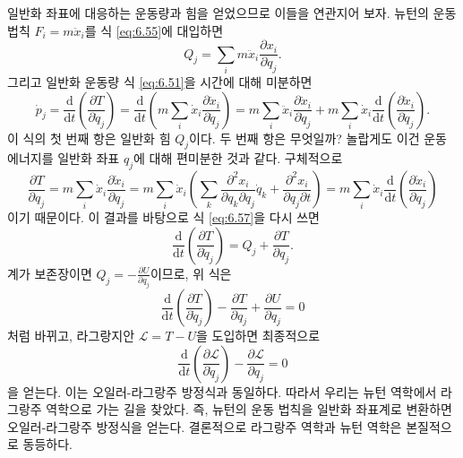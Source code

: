 \documentclass[chapter, oneside, b5paper]{oblivoir}
\theoremstyle{plain}
\theoremstyle{definition}
\theoremstyle{remark}
\begin{document}
일반화 좌표에 대응하는 운동량과 힘을 얻었으므로 이들을 연관지어 보자. 뉴턴의 운동 법칙 $F_i = m\ddot{x}_i$를 식 \ref{eq:6.55}에 대입하면
\begin{equation}
    Q_j = \sum_i m\ddot{x}_i \frac{\partial x_i}{\partial q_j}.
\end{equation}
그리고 일반화 운동량 식 \ref{eq:6.51}을 시간에 대해 미분하면
\begin{equation}
    \dot{p}_j = \frac{\mathrm{d}}{\mathrm{d}t}\left(\frac {\partial T}{\partial \dot{q}_j} \right)= \frac{\mathrm{d}}{\mathrm{d}t}\left(m\sum_i \dot{x}_i\frac{\partial \dot{x}_i}{\partial \dot{q}_j}\right) = m\sum_i \ddot{x}_i\frac{\partial \dot{x}_i}{\partial \dot{q}_j} + m\sum_i \dot{x}_i\frac{\mathrm{d}}{\mathrm{d}t}\left(\frac{\partial \dot{x}_i}{\partial \dot{q}_j}\right). \label{eq:6.57}
\end{equation}
이 식의 첫 번째 항은 일반화 힘 $Q_j$이다. 두 번째 항은 무엇일까? 놀랍게도 이건 운동 에너지를 일반화 좌표 $q_j$에 대해 편미분한 것과 같다. 구체적으로
\begin{equation}
\frac{\partial T}{\partial q_j} = m\sum_i \dot{x}_i \frac{\partial \dot{x}_i}{\partial q_j} = m\sum_i \dot{x}_i \left( \sum_k \frac{\partial^2 x_i}{\partial q_k \partial q_j} \dot{q}_k + \frac{\partial^2 x_i}{\partial q_j \partial t} \right) = m\sum_i \dot{x}_i\frac{\mathrm{d}}{\mathrm{d}t}\left(\frac{\partial \dot{x}_i}{\partial q_j}\right)
\end{equation}
이기 때문이다. 이 결과를 바탕으로 식 \ref{eq:6.57}을 다시 쓰면
\begin{equation}
    \frac{\mathrm{d}}{\mathrm{d}t}\left(\frac{\partial T}{\partial \dot{q}_j} \right) = Q_j + \frac{\partial T}{\partial q_j}.
\end{equation}
계가 보존장이면 $Q_j = -\frac{\partial U}{\partial q_j}$이므로, 위 식은
\begin{equation}
    \frac{\mathrm{d}}{\mathrm{d}t}\left(\frac{\partial T}{\partial \dot{q}_j} \right) - \frac{\partial T}{\partial q_j} + \frac{\partial U}{\partial q_j} = 0
\end{equation}
처럼 바뀌고, 라그랑지안 $\mathcal{L} = T - U$을 도입하면 최종적으로
\begin{equation}
    \frac{\mathrm{d}}{\mathrm{d}t}\left(\frac{\partial \mathcal{L}}{\partial \dot{q}_j} \right) - \frac{\partial \mathcal{L}}{\partial q_j} = 0
\end{equation}
을 얻는다. 이는 오일러-라그랑주 방정식과 동일하다. 따라서 우리는 뉴턴 역학에서 라그랑주 역학으로 가는 길을 찾았다. 즉, 뉴턴의 운동 법칙을 일반화 좌표계로 변환하면 오일러-라그랑주 방정식을 얻는다. 결론적으로 라그랑주 역학과 뉴턴 역학은 본질적으로 동등하다.
\end{document}
